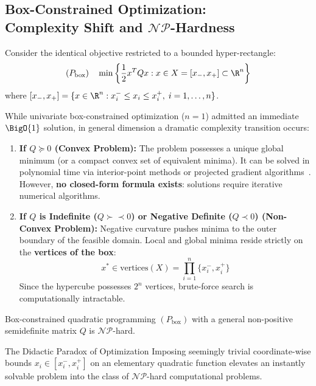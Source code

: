 \subsection[Box-Constrained Optimization: Complexity Shift]{Box-Constrained Optimization:\\ Complexity Shift and \texorpdfstring{$\mathcal{NP}$}{NP}-Hardness}
Consider the identical objective restricted to a bounded hyper-rectangle:
\begin{equation}
(P_{\text{box}}) \quad \min \left\{ \frac{1}{2} x^T Q x : x \in X = [x_-, x_+] \subset \R^n \right\}
\end{equation}
where $[x_-, x_+] = \{x \in \R^n : x_i^- \le x_i \le x_i^+, \; i = 1, \dots, n\}$.

While univariate box-constrained optimization ($n = 1$) admitted an immediate $\BigO{1}$ solution, in general dimension a dramatic complexity transition occurs:

\begin{enumerate}
    \item \textbf{If $Q \succeq 0$ (Convex Problem):}
    The problem possesses a unique global minimum (or a compact convex set of equivalent minima). It can be solved in polynomial time via interior-point methods or projected gradient algorithms~\cite{boyd2004convex, nocedal2006numerical}. However, \textbf{no closed-form formula exists}: solutions require iterative numerical algorithms.
    
    \item \textbf{If $Q$ is Indefinite ($Q \succ\prec 0$) or Negative Definite ($Q \prec 0$) (Non-Convex Problem):}
    Negative curvature pushes minima to the outer boundary of the feasible domain. Local and global minima reside strictly on the \textbf{vertices of the box}:
    \begin{equation}
    x^* \in \text{vertices}(X) = \prod_{i=1}^n \{x_i^-, x_i^+\}
    \end{equation}
    Since the hypercube possesses $2^n$ vertices, brute-force search is computationally intractable.
\end{enumerate}

\begin{theorem}
Box-constrained quadratic programming $(P_{\text{box}})$ with a general non-positive semidefinite matrix $Q$ is $\mathcal{NP}$-hard.
\end{theorem}

\begin{alertblock}{The Didactic Paradox of Optimization}
Imposing seemingly trivial coordinate-wise bounds $x_i \in [x_i^-, x_i^+]$ on an elementary quadratic function elevates an instantly solvable problem into the class of $\mathcal{NP}$-hard computational problems.
\end{alertblock}
